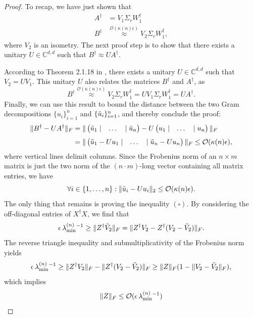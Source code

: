 \begin{proof}
To recap, we have just shown that
\begin{align*}
A^{\dag} & =V_1\Sigma_r W_1^{\dag} \\[0.3em]
B^{\dag} & \stackrel{\mathcal{O}(\kappa(n)\epsilon)}{\approx} V_2\Sigma_r W_1^{\dag},
\end{align*}
where $V_2$ is an isometry. The next proof step is to show that there exists a unitary $U\in\mathbb{C}^{d,d}$ such that $B^{\dag}\approx U A^{\dag}$.

According to Theorem 2.1.18 in \cite{Horn2013}, there exists a unitary $U\in\mathbb{C}^{d,d}$ such that $V_2=UV_1$. This unitary $U$ also relates the matrices $B^{\dag}$ and $A^{\dag}$, as
\begin{equation*}
B^{\dag}\stackrel{\mathcal{O}(\kappa(n)\epsilon)}{\approx}V_2\Sigma_r W_1^{\dag}= UV_1\Sigma_r W_1^{\dag}=UA^{\dag}.
\end{equation*} 
Finally, we can use this result to bound the distance between the two Gram decompositions $\{u_i\}_{i=1}^n$ and $\{\Tilde{u}_i\}_{i=1}^n$, and thereby conclude the proof:
\begin{align*}
\|B^{\dag}-UA^{\dag}\|_F&=\|
\begin{pmatrix}
\Tilde{u}_1 \;| & \dots & |\; \Tilde{u}_n
\end{pmatrix}-U
\begin{pmatrix}
u_1 \;| & \dots &  | \; u_n
\end{pmatrix} \|_F \\[0.3em]
& = \|
\begin{pmatrix}
\Tilde{u}_1-U u_1\; | &\dots& |\;\Tilde{u}_n-U u_n
\end{pmatrix}
\|_F\leq\mathcal{O}(\kappa(n)\epsilon),
\end{align*}
where vertical lines delimit columns.
Since the Frobenius norm of an $n\times m$ matrix is just the two norm of the $(n\cdot m)$-long vector containing all matrix entries, we have
\begin{equation*}
\forall i\in\{1,\dots,n\}: \|\Tilde{u}_i-U u_i\|_2 \leq \mathcal{O}(\kappa(n)\epsilon).
\end{equation*}
The only thing that remains is proving the inequality $(\square)$. By considering the off-diagonal entries of $X^{\dag}X$, we find that
\begin{equation*}
\epsilon\thinspace\lambda_{\text{min}}^{(n)}{}^{-1} \geq \|Z^{\dag}\Tilde{V}_2\|_F=\|Z^{\dag}V_2 - Z^{\dag}(V_2-\Tilde{V}_2)\|_F.
\end{equation*}
The reverse triangle inequality and submultiplicativity of the Frobenius norm yields
\begin{equation*}
\epsilon\thinspace\lambda_{\text{min}}^{(n)}{}^{-1} \geq \|Z^{\dag}V_2\|_F - \|Z^{\dag}(V_2-\Tilde{V}_2)\|_F \geq \|Z\|_F(1-\|V_2-\Tilde{V}_2\|_F),
\end{equation*}
which implies
\begin{equation*}
\|Z\|_F \leq \mathcal{O}(\epsilon\thinspace\lambda_{\text{min}}^{(n)}{}^{-1})
\end{equation*}
\end{proof}

